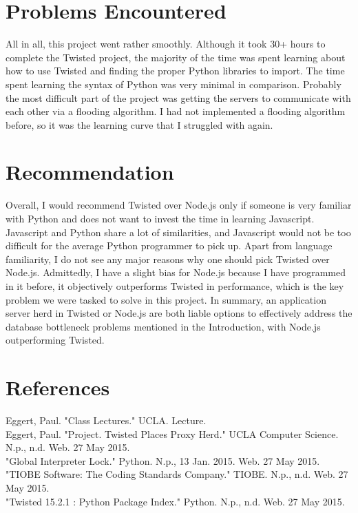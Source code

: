 \documentclass[letterpaper,twocolumn,10pt]{article}
\begin{document}
\section{Problems Encountered}
All in all, this project went rather smoothly. Although it took 30+ hours to complete the Twisted project, the majority of the time was spent learning about how to use Twisted and finding the proper Python libraries to import. The time spent learning the syntax of Python was very minimal in comparison. Probably the most difficult part of the project was getting the servers to communicate with each other via a flooding algorithm. I had not implemented a flooding algorithm before, so it was the learning curve that I struggled with again.

\section{Recommendation}
Overall, I would recommend Twisted over Node.js only if someone is very familiar with Python and does not want to invest the time in learning Javascript. Javascript and Python share a lot of similarities, and Javascript would not be too difficult for the average Python programmer to pick up. Apart from language familiarity, I do not see any major reasons why one should pick Twisted over Node.js. Admittedly, I have a slight bias for Node.js because I have programmed in it before, it objectively outperforms Twisted in performance, which is the key problem we were tasked to solve in this project. 
In summary, an application server herd in Twisted or Node.js are both liable options to effectively address the database bottleneck problems mentioned in the Introduction, with Node.js outperforming Twisted.


\section{References}

Eggert, Paul. "Class Lectures." UCLA. Lecture. \\
Eggert, Paul. "Project. Twisted Places Proxy Herd." UCLA Computer Science. N.p., n.d. Web. 27 May 2015.\\
"Global Interpreter Lock." Python. N.p., 13 Jan. 2015. Web. 27 May 2015.\\
"TIOBE Software: The Coding Standards Company." TIOBE. N.p., n.d. Web. 27 May 2015.\\
"Twisted 15.2.1 : Python Package Index." Python. N.p., n.d. Web. 27 May 2015.\\

{\footnotesize 
}
\end{document}
